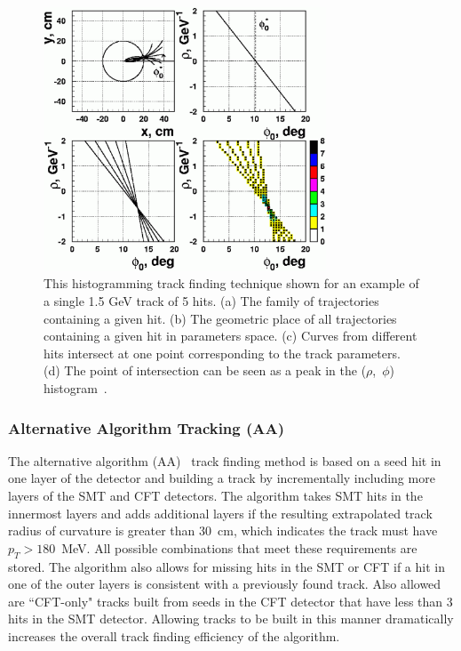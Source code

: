 \begin{figure}[!h!tbp]
\begin{center}
\includegraphics[width=0.75\textwidth]{eps/Reco/htf.eps}
\end{center}
\vspace{-0.1in}
\caption{This histogramming track finding technique shown for an example of a single 1.5 GeV track of 5 hits. (a) The family of trajectories containing a given hit. (b) The geometric place of all trajectories containing a given hit in parameters space. (c) Curves from different hits intersect at one point corresponding to the track parameters. (d) The point of intersection can be seen as a peak in the ($\rho$,~$\phi$) histogram~\cite{htf}.}
\label{histogramming}
\end{figure}


\subsubsection{Alternative Algorithm Tracking (AA)}
\label{aa}

The alternative algorithm (AA)~\cite{aa} track finding method is based on a seed hit in one layer of the detector and building a track by incrementally including more layers of the SMT and CFT detectors. The algorithm takes SMT hits in the innermost layers and adds additional layers if the resulting extrapolated track radius of curvature is greater than $30$~cm, which indicates the track must have $p_{T}>180$~MeV. All possible combinations that meet these requirements are stored. The algorithm also allows for missing hits in the SMT or CFT if a hit in one of the outer layers is consistent with a previously found track. Also allowed are ``CFT-only" tracks built from seeds in the CFT detector that have less than 3 hits in the SMT detector. Allowing tracks to be built in this manner dramatically increases the overall track finding efficiency of the algorithm.


